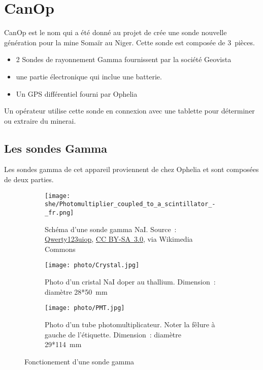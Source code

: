 \section{CanOp}
\label{sec_CanOp}
CanOp est le nom qui a été donné au projet de crée une sonde nouvelle génération pour la mine Somaïr au Niger. Cette sonde est composée de 3~pièces.
\begin{itemize}
    \item 2 Sondes de rayonnement Gamma fournissent par la société Geovista
    \item une partie électronique qui inclue une batterie.
    \item Un GPS différentiel fourni par Ophelia
\end{itemize}
Un opérateur utilise cette sonde en connexion avec une tablette pour déterminer ou extraire du minerai.
\subsection{Les sondes Gamma}
\label{ssec_sonde}
Les sondes gamma de cet appareil proviennent de chez Ophelia et sont composées de deux parties.
\begin{figure}

    \begin{subfigure}{1\textwidth}
        \centering
        \texttt{[image: she/Photomultiplier\_coupled\_to\_a\_scintillator\_-\_fr.png]}
        \caption[Shema d'une sonde gamma NaI]{Schéma d'une sonde gamma NaI. Source~: \href{https://commons.wikimedia.org/wiki/File:Photomultiplier_coupled_to_a_scintillator_-_fr.png}{Qwerty123uiop}, \href{https://creativecommons.org/licenses/by-sa/3.0}{CC BY-SA~3.0}, via Wikimedia Commons}
        \label{fig_detecteur_gamma}
    \end{subfigure}
    \begin{subfigure}[t]{0.5\textwidth}
        \centering
        \texttt{[image: photo/Crystal.jpg]}

        \caption[Photo d'un cristal NaI]{Photo d'un cristal NaI doper au thallium. Dimension~: diamètre 28*50~mm}
        \label{fig_Nai}
    \end{subfigure}
    \begin{subfigure}[t]{0.5\textwidth}
        \centering
        \texttt{[image: photo/PMT.jpg]}

        \caption[Photo d'un tube photomultiplicateur]{Photo d'un tube photomultiplicateur. Noter la fêlure à gauche de l'étiquette. Dimension~: diamètre 29*114~mm}
        \label{fig_PMT}
    \end{subfigure}
    \caption{Fonctionement d'une sonde gamma}

\end{figure}
